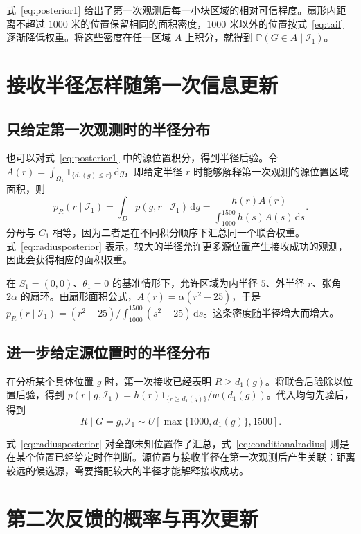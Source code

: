 \documentclass[UTF8,a4paper,zihao=-4,fontset=none]{ctexart}
\numberwithin{equation}{section}
\newcommand{\ind}{\mathbf 1}
\newcommand{\dd}{\,\mathrm d}
\newcommand{\Prob}{\mathbb P}
\begin{document}
式~\eqref{eq:posterior1} 给出了第一次观测后每一小块区域的相对可信程度。扇形内距离不超过 \(1000\) 米的位置保留相同的面积密度，\(1000\) 米以外的位置按式~\eqref{eq:tail} 逐渐降低权重。将这些密度在任一区域 \(A\) 上积分，就得到 \(\Prob(G\in A\mid\mathcal I_1)\)。

\section{接收半径怎样随第一次信息更新}
\subsection{只给定第一次观测时的半径分布}
也可以对式~\eqref{eq:posterior1} 中的源位置积分，得到半径后验。令 \(A(r)=\int_{\Omega_1}\ind_{\{d_1(g)\le r\}}\dd g\)，即给定半径 \(r\) 时能够解释第一次观测的源位置区域面积，则
\begin{equation}\label{eq:radiusposterior}
p_R(r\mid\mathcal I_1)
=\int_Dp(g,r\mid\mathcal I_1)\dd g
=\frac{h(r)A(r)}{\int_{1000}^{1500}h(s)A(s)\dd s}.
\end{equation}
分母与 \(C_1\) 相等，因为二者是在不同积分顺序下汇总同一个联合权重。式~\eqref{eq:radiusposterior} 表示，较大的半径允许更多源位置产生接收成功的观测，因此会获得相应的面积权重。

在 \(S_1=(0,0)\)、\(\theta_1=0\) 的基准情形下，允许区域为内半径 \(5\)、外半径 \(r\)、张角 \(2\alpha\) 的扇环。由扇形面积公式，\(A(r)=\alpha(r^2-25)\)，于是 \(p_R(r\mid\mathcal I_1)=(r^2-25)/\int_{1000}^{1500}(s^2-25)\dd s\)。这条密度随半径增大而增大。

\subsection{进一步给定源位置时的半径分布}
在分析某个具体位置 \(g\) 时，第一次接收已经表明 \(R\ge d_1(g)\)。将联合后验除以位置后验，得到 \(p(r\mid g,\mathcal I_1)=h(r)\ind_{\{r\ge d_1(g)\}}/w(d_1(g))\)。代入均匀先验后，得到
\begin{equation}\label{eq:conditionalradius}
R\mid G=g,\mathcal I_1
\sim U\!\left[\max\{1000,d_1(g)\},1500\right].
\end{equation}

式~\eqref{eq:radiusposterior} 对全部未知位置作了汇总，式~\eqref{eq:conditionalradius} 则是在某个位置已经给定时作判断。源位置与接收半径在第一次观测后产生关联：距离较远的候选源，需要搭配较大的半径才能解释接收成功。

\section{第二次反馈的概率与再次更新}
\end{document}
